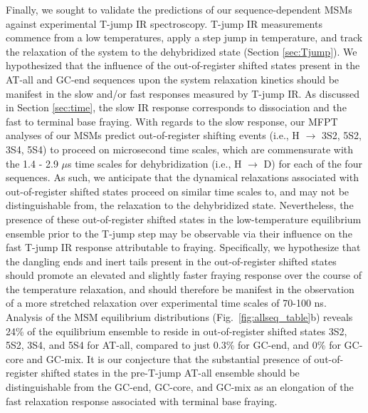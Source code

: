 \documentclass[journal=jpcbfk,manuscript=article]{achemso}
\begin{document}
Finally, we sought to validate the predictions of our sequence-dependent MSMs against experimental T-jump IR spectroscopy. T-jump IR measurements commence from a low temperatures, apply a step jump in temperature, and track the relaxation of the system to the dehybridized state (Section \ref{sec:Tjump}). We hypothesized that the influence of the out-of-register shifted states present in the AT-all and GC-end sequences upon the system relaxation kinetics should be manifest in the slow and/or fast responses measured by T-jump IR. As discussed in Section \ref{sec:time}, the slow IR response corresponds to dissociation and the fast to terminal base fraying. With regards to the slow response, our MFPT analyses of our MSMs predict out-of-register shifting events (i.e., H $\rightarrow$ 3S2, 5S2, 3S4, 5S4) to proceed on microsecond time scales, which are commensurate with the 1.4 - 2.9 $\mu$s time scales for dehybridization (i.e., H $\rightarrow$ D) for each of the four sequences. As such, we anticipate that the dynamical relaxations associated with out-of-register shifted states proceed on similar time scales to, and may not be distinguishable from, the relaxation to the dehybridized state. Nevertheless, the presence of these out-of-register shifted states in the low-temperature equilibrium ensemble prior to the T-jump step may be observable via their influence on the fast T-jump IR response attributable to fraying. Specifically, we hypothesize that the dangling ends and inert tails present in the out-of-register shifted states should promote an elevated and slightly faster fraying response over the course of the temperature relaxation, and should therefore be manifest in the observation of a more stretched relaxation over experimental time scales of 70-100 ns. Analysis of the MSM equilibrium distributions (Fig.~\ref{fig:allseq_table}b) reveals 24\% of the equilibrium ensemble to reside in out-of-register shifted states 3S2, 5S2, 3S4, and 5S4 for AT-all, compared to just 0.3\% for GC-end, and 0\% for GC-core and GC-mix. It is our conjecture that the substantial presence of out-of-register shifted states in the pre-T-jump AT-all ensemble should be distinguishable from the GC-end, GC-core, and GC-mix as an elongation of the fast relaxation response associated with terminal base fraying.
\end{document}
